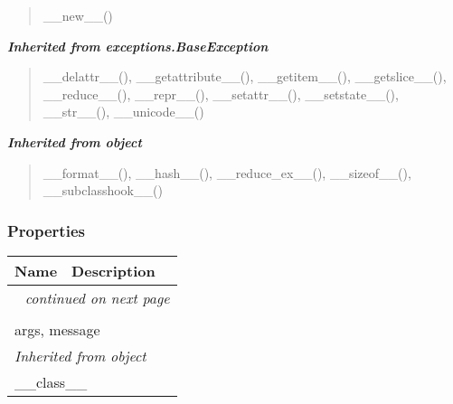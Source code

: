 \begin{quote}
\_\_new\_\_()
\end{quote}

\large{\textbf{\textit{Inherited from exceptions.BaseException}}}

\begin{quote}
\_\_delattr\_\_(), \_\_getattribute\_\_(), \_\_getitem\_\_(), \_\_getslice\_\_(), \_\_reduce\_\_(), \_\_repr\_\_(), \_\_setattr\_\_(), \_\_setstate\_\_(), \_\_str\_\_(), \_\_unicode\_\_()
\end{quote}

\large{\textbf{\textit{Inherited from object}}}

\begin{quote}
\_\_format\_\_(), \_\_hash\_\_(), \_\_reduce\_ex\_\_(), \_\_sizeof\_\_(), \_\_subclasshook\_\_()
\end{quote}


  \subsubsection{Properties}

    \vspace{-1cm}
\hspace{\varindent}\begin{longtable}{|p{\varnamewidth}|p{\vardescrwidth}|l}
\cline{1-2}
\cline{1-2} \centering \textbf{Name} & \centering \textbf{Description}& \\
\cline{1-2}
\endhead\cline{1-2}\multicolumn{3}{r}{\small\textit{continued on next page}}\\\endfoot\cline{1-2}
\endlastfoot\multicolumn{2}{|l|}{\textit{Inherited from exceptions.BaseException}}\\
\multicolumn{2}{|p{\varwidth}|}{\raggedright args, message}\\
\cline{1-2}
\multicolumn{2}{|l|}{\textit{Inherited from object}}\\
\multicolumn{2}{|p{\varwidth}|}{\raggedright \_\_class\_\_}\\
\cline{1-2}
\end{longtable}



